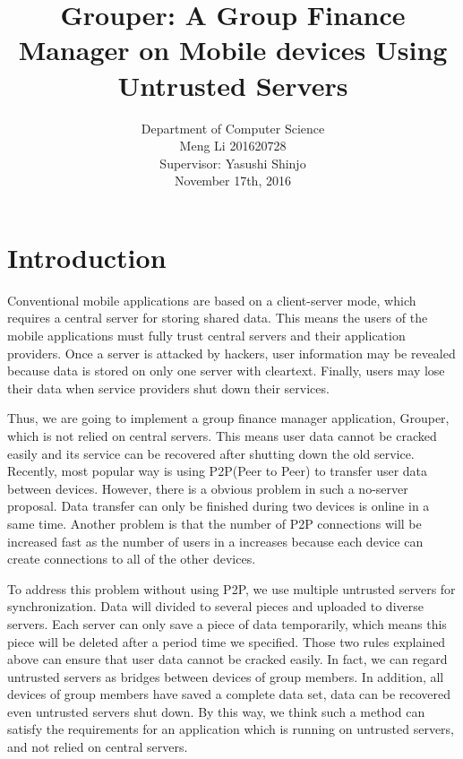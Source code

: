 \documentclass[twocolumn,10pt]{article}
\begin{document}
\date{}

\title{\bf Grouper: A Group Finance Manager on Mobile devices Using Untrusted Servers}

\author{Department of Computer Science
	\\ Meng Li 201620728  
	\\ Supervisor: Yasushi Shinjo
	\\ November 17th, 2016
}

\maketitle

\section{Introduction}
Conventional mobile applications are based on a client-server mode, which requires a central server for storing shared data. This means the users of the mobile applications must fully trust central servers and their application providers. Once a server is attacked by hackers, user information may be revealed because data is stored on only one server with cleartext. Finally, users may lose their data when service providers shut down their services.

Thus, we are going to implement a group finance manager application, Grouper, which is not relied on central servers. This means user data cannot be cracked easily and its service can be recovered after shutting down the old service. Recently, most popular way is using P2P(Peer to Peer) to transfer user data between devices. However, there is a obvious problem in such a no-server proposal. Data transfer can only be finished during two devices is online in a same time. Another problem is that the number of P2P connections will be increased fast as the number of users in a increases because each device can create  connections to all of the other devices. 

To address this problem without using P2P, we use multiple untrusted servers for synchronization. Data will divided to several pieces and uploaded to diverse servers. Each server can only save a piece of data temporarily, which means this piece will be deleted after a period time we specified. Those two rules explained above can ensure that user data cannot be cracked easily. In fact, we can regard untrusted servers as bridges between devices of group members. In addition, all devices of group members have saved a complete data set, data can be recovered even untrusted servers shut down. By this way, we think such a method can satisfy the requirements for an application which is running on untrusted servers, and not relied on central servers.
\end{document}
